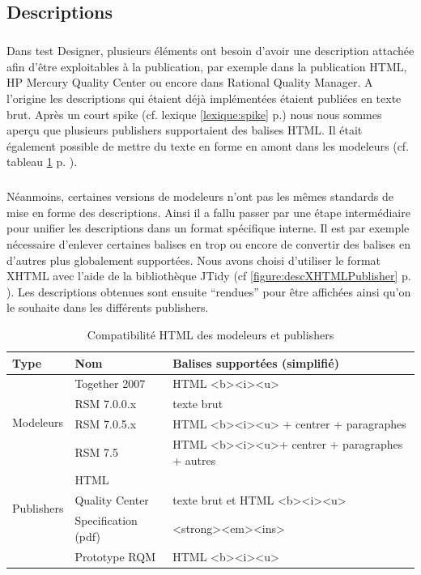 \subsection{Descriptions}
\subparagraph*{}
Dans test Designer, plusieurs éléments ont besoin d'avoir une description attachée afin d'être exploitables à la publication, par exemple dans la publication HTML, HP Mercury Quality Center ou encore dans Rational Quality Manager. A l'origine les descriptions qui étaient déjà implémentées étaient publiées en texte brut. Après un court spike (cf. lexique \ref{lexique:spike} p.\pageref{lexique:spike}) nous nous sommes aperçu que plusieurs publishers supportaient des balises HTML. Il était également possible de mettre du texte en forme en amont dans les modeleurs (cf. tableau \ref{tableau:compatDescHTML} p. \pageref{tableau:compatDescHTML}). \subparagraph*{}
Néanmoins, certaines versions de modeleurs n'ont pas les mêmes standards de mise en forme des descriptions. Ainsi il a fallu passer par une étape intermédiaire pour unifier les descriptions dans un format spécifique interne. Il est par exemple nécessaire d'enlever certaines balises en trop ou encore de convertir des balises en d'autres plus globalement supportées. Nous avons choisi d'utiliser le format XHTML avec l'aide de la bibliothèque JTidy (cf \ref{figure:descXHTMLPublisher} p. \pageref{figure:descXHTMLPublisher}). Les descriptions obtenues sont ensuite ``rendues'' pour être affichées ainsi qu'on le souhaite dans les différents publishers.
\begin{table}[!ht]
\caption{\label{tableau:compatDescHTML}Compatibilité HTML des modeleurs et publishers}
\begin{tabular}{|l|l|l|}
\hline
Type & Nom & Balises supportées (simplifié) \\
\hline
\hline
\multirow{4}{*}{Modeleurs} & Together 2007 & HTML <b><i><u> \\
& RSM 7.0.0.x & texte brut\\
& RSM 7.0.5.x & HTML <b><i><u> + centrer + paragraphes\\ 
& RSM 7.5 & HTML <b><i><u>+ centrer + paragraphes + autres\\ \hline
\multirow{3}{*}{Publishers} & HTML & \\
& Quality Center & texte brut et HTML <b><i><u> \\
& Specification (pdf) & <strong><em><ins> \\
& Prototype RQM & HTML <b><i><u> \\ \hline
\end{tabular}
\end{table}
